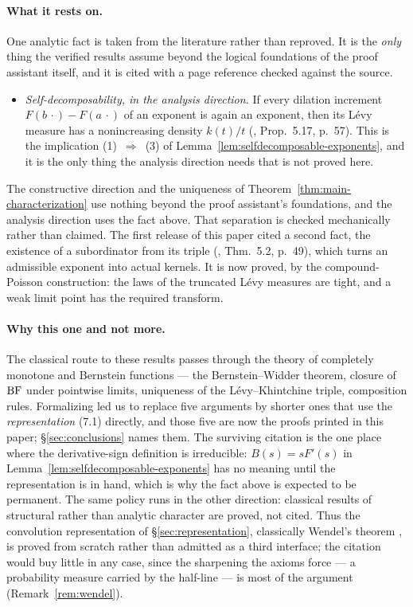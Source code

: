 \paragraph{What it rests on.} One analytic fact is taken from the literature rather than
reproved. It is the \emph{only} thing the verified results assume beyond the logical
foundations of the proof assistant itself, and it is cited with a page reference checked
against the source.
\begin{itemize}
\item \emph{Self-decomposability, in the analysis direction.} If every dilation increment
$F(b\,\cdot) - F(a\,\cdot)$ of an exponent is again an exponent, then its Lévy measure has a
nonincreasing density $k(t)/t$ (, Prop.~5.17, p.~57). This is
the implication (1)~$\Rightarrow$~(3) of Lemma~\ref{lem:selfdecomposable-exponents}, and it
is the only thing the analysis direction needs that is not proved here.
\end{itemize}

The constructive direction and the uniqueness of Theorem~\ref{thm:main-characterization} use
nothing beyond the proof assistant's foundations, and the analysis direction uses the fact
above. That separation is checked mechanically rather than claimed. The first release of
this paper cited a second fact, the existence of a subordinator from its triple
(, Thm.~5.2, p.~49), which turns an admissible exponent into
actual kernels. It is now proved, by the compound-Poisson construction: the laws of the
truncated Lévy measures are tight, and a weak limit point has the required transform.

\paragraph{Why this one and not more.} The classical route to these results passes through
the theory of completely monotone and Bernstein functions --- the Bernstein--Widder theorem,
closure of $\mathrm{BF}$ under pointwise limits, uniqueness of the Lévy--Khintchine triple,
composition rules. Formalizing led us to replace five arguments by shorter ones that use the
\emph{representation} (7.1) directly, and those five are now the proofs printed in this
paper; \S\ref{sec:conclusions} names them. The surviving citation is the one place where the derivative-sign
definition is irreducible: $B(s) = sF'(s)$ in Lemma~\ref{lem:selfdecomposable-exponents} has
no meaning until the representation is in hand, which is why the fact above is expected to
be permanent. The same policy runs in the other direction: classical results of structural
rather than analytic character are proved, not cited. Thus the convolution representation of
\S\ref{sec:representation}, classically Wendel's theorem , is proved
from scratch rather than admitted as a third interface; the citation would buy little in any
case, since the sharpening the axioms force --- a probability measure carried by the
half-line --- is most of the argument (Remark~\ref{rem:wendel}).

